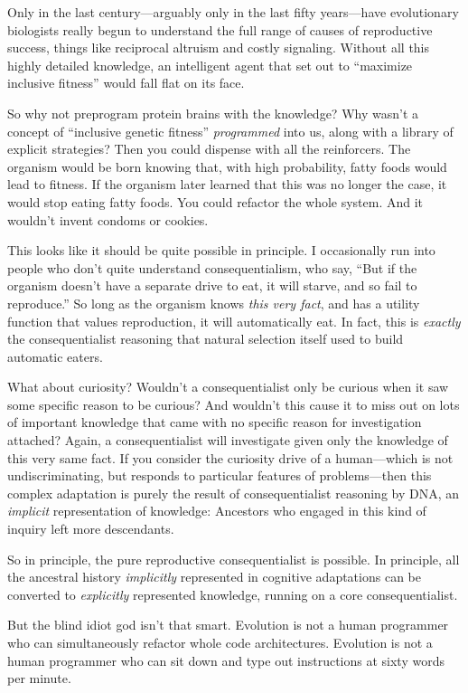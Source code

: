 {{
 Only in the last century---arguably only in the last fifty
years---have evolutionary biologists really begun to understand the
full range of causes of reproductive success, things like reciprocal
altruism and costly signaling. Without all this highly detailed
knowledge, an intelligent agent that set out to
``maximize inclusive fitness'' would
fall flat on its face.}

{
 So why not preprogram protein brains with the knowledge? Why
wasn't a concept of ``inclusive
genetic fitness'' \textit{programmed} into us, along
with a library of explicit strategies? Then you could dispense with all
the reinforcers. The organism would be born knowing that, with high
probability, fatty foods would lead to fitness. If the organism later
learned that this was no longer the case, it would stop eating fatty
foods. You could refactor the whole system. And it
wouldn't invent condoms or cookies.}

{
 This looks like it should be quite possible in principle. I
occasionally run into people who don't quite understand
consequentialism, who say, ``But if the organism
doesn't have a separate drive to eat, it will starve,
and so fail to reproduce.'' So long as the organism
knows \textit{this very fact}, and has a utility function that values
reproduction, it will automatically eat. In fact, this is
\textit{exactly} the consequentialist reasoning that natural selection
itself used to build automatic eaters.}

{
 What about curiosity? Wouldn't a consequentialist
only be curious when it saw some specific reason to be curious? And
wouldn't this cause it to miss out on lots of important
knowledge that came with no specific reason for investigation attached?
Again, a consequentialist will investigate given only the knowledge of
this very same fact. If you consider the curiosity drive of a
human---which is not undiscriminating, but responds to particular
features of problems---then this complex adaptation is purely the
result of consequentialist reasoning by DNA, an \textit{implicit}
representation of knowledge: Ancestors who engaged in this kind of
inquiry left more descendants.}

{
 So in principle, the pure reproductive consequentialist is
possible. In principle, all the ancestral history \textit{implicitly}
represented in cognitive adaptations can be converted to
\textit{explicitly} represented knowledge, running on a core
consequentialist.}

{
 But the blind idiot god isn't that smart.
Evolution is not a human programmer who can simultaneously refactor
whole code architectures. Evolution is not a human programmer who can
sit down and type out instructions at sixty words per minute.}

}
